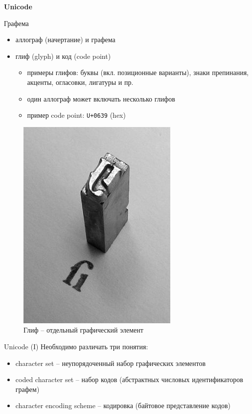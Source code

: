 \documentclass{beamer}
\begin{document}
\begin{frame}{}
\begin{center}
\textbf{Unicode}
\end{center}
\end{frame}

\begin{frame}{Графема}
\begin{itemize}
\item аллограф (начертание) и графема
\item глиф (glyph) и код (code point)
	\begin{itemize}
		\item примеры глифов: буквы (вкл. позиционные варианты), знаки препинания, акценты, огласовки, лигатуры и пр.
		\item один аллограф может включать несколько глифов
		\item пример code point: \texttt{U+0639} (hex)
	\end{itemize}
\end{itemize}
\bigskip
\begin{figure}[H]
	\includegraphics[scale=0.2]{glyph.jpg} 
	\caption*{Глиф -- отдельный графический элемент}
\end{figure}
\end{frame}

\begin{frame}{Unicode (I)}
Необходимо различать три понятия:\\
\bigskip
\begin{itemize}
\item character set -- неупорядоченный набор графических элементов
\item coded character set -- набор кодов (абстрактных числовых идентификаторов графем)
\item character encoding scheme -- кодировка (байтовое представление кодов)
\end{itemize}
\end{frame}
\end{document}
